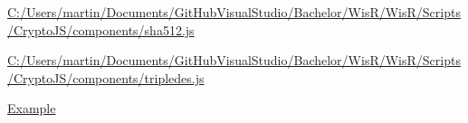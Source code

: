 \begin{DoxyCompactItemize}
\hyperlink{_c_1_2_users_2martin_2_documents_2_git_hub_visual_studio_2_bachelor_2_wis_r_2_wis_r_2_scripts_2_dc99dd62c551a04a8040b24e4d0ebeb3}{C\+:/\+Users/martin/\+Documents/\+Git\+Hub\+Visual\+Studio/\+Bachelor/\+Wis\+R/\+Wis\+R/\+Scripts/\+Crypto\+J\+S/components/sha512.\+js}
\item 
\hyperlink{_c_1_2_users_2martin_2_documents_2_git_hub_visual_studio_2_bachelor_2_wis_r_2_wis_r_2_scripts_2_57e238d514d0364898c989f355509978}{C\+:/\+Users/martin/\+Documents/\+Git\+Hub\+Visual\+Studio/\+Bachelor/\+Wis\+R/\+Wis\+R/\+Scripts/\+Crypto\+J\+S/components/tripledes.\+js}
\item 
\hyperlink{_example-example}{Example}
\end{DoxyCompactItemize}
